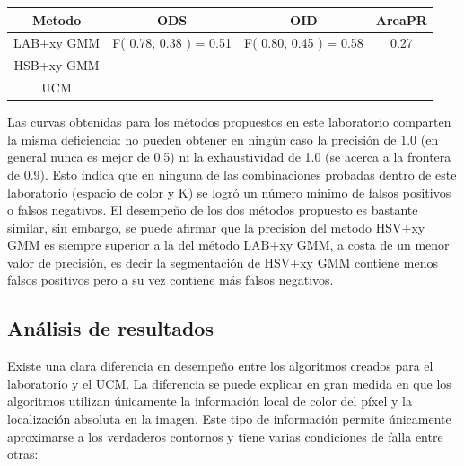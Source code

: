 \documentclass[10pt,twocolumn,letterpaper]{article}
\begin{document}
\begin{table}[t]
\centering
\begin{tabular}{c | c | c | c }
Metodo & ODS & OID & AreaPR  \\
\hline	
LAB+xy GMM & F( 0.78, 0.38 ) = 0.51  & F( 0.80, 0.45 ) = 0.58 & 0.27 \\
HSB+xy GMM &  &  &  \\
UCM &  &  &  \\
\end{tabular}
\label{table:thetable}
\end{table}


Las curvas obtenidas para los métodos propuestos en este laboratorio comparten la misma deficiencia:  no pueden obtener en ningún caso la precisión de 1.0 (en general nunca es mejor de 0.5) ni la exhaustividad de 1.0 (se acerca a la frontera de 0.9). Esto indica que en ninguna de las combinaciones probadas dentro de este laboratorio (espacio de color y K) se logró un número mínimo de falsos positivos o falsos negativos. El desempeño de los dos métodos propuesto es bastante similar, sin embargo, se puede afirmar que la precision del metodo HSV+xy GMM es siempre superior a la del método LAB+xy GMM, a costa de un menor valor de precisión, es decir la segmentación de HSV+xy GMM contiene menos falsos positivos pero a su vez contiene más falsos negativos.


\subsection{Análisis de resultados}

Existe una clara diferencia en desempeño entre los algoritmos creados para el laboratorio y el UCM. La diferencia se puede explicar en gran medida en que los algoritmos utilizan únicamente la información local de color del píxel y la localización absoluta en la imagen. Este tipo de información permite únicamente aproximarse a los verdaderos contornos y tiene varias condiciones de falla entre otras:
\end{document}
